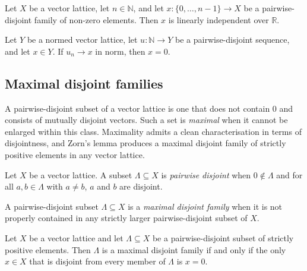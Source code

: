 \begin{theorem}
\label{thm:linearIndependent-of-pairwise-isVLDisjoint}
\leanok
{}
Let $X$ be a vector lattice, let $n \in \mathbb{N}$, and let
$x : \{0, \dots, n-1\} \to X$ be a pairwise-disjoint family of non-zero
elements. Then $x$ is linearly independent over $\mathbb{R}$.
\end{theorem}

\begin{theorem}
\label{thm:eq-zero-of-pairwise-isVLDisjoint-tendsto}
\leanok
{}
Let $Y$ be a normed vector lattice, let $u : \mathbb{N} \to Y$ be a
pairwise-disjoint sequence, and let $x \in Y$. If $u_n \to x$ in norm,
then $x = 0$.
\end{theorem}

\subsection{Maximal disjoint families}

A pairwise-disjoint subset of a vector lattice is one that does not
contain $0$ and consists of mutually disjoint vectors. Such a set is
\emph{maximal} when it cannot be enlarged within this class. Maximality
admits a clean characterisation in terms of disjointness, and Zorn's
lemma produces a maximal disjoint family of strictly positive elements
in any vector lattice.

\begin{definition}
\label{def:isDisjointSet}
\leanok
{}
Let $X$ be a vector lattice. A subset $\Lambda \subseteq X$ is
\emph{pairwise disjoint} when $0 \notin \Lambda$ and for all
$a, b \in \Lambda$ with $a \ne b$, $a$ and $b$ are disjoint.
\end{definition}

\begin{definition}
\label{def:isMaximalDisjoint}
\leanok
{}
A pairwise-disjoint subset $\Lambda \subseteq X$ is a \emph{maximal
disjoint family} when it is not properly contained in any strictly
larger pairwise-disjoint subset of $X$.
\end{definition}

\begin{theorem}
\label{thm:isMaximalDisjoint-iff-forall-eq-zero}
\leanok
{}
Let $X$ be a vector lattice and let $\Lambda \subseteq X$ be a
pairwise-disjoint subset of strictly positive elements. Then $\Lambda$
is a maximal disjoint family if and only if the only $x \in X$ that is
disjoint from every member of $\Lambda$ is $x = 0$.
\end{theorem}

